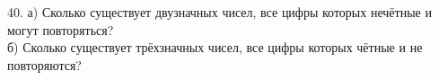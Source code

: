 40. а) Сколько существует двузначных чисел, все цифры которых нечётные и могут повторяться?\\
б) Сколько существует трёхзначных чисел, все цифры которых чётные и не повторяются?\\

